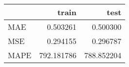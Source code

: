 \begin{tabular}{lrr}
\toprule
{} &       train &        test \\
\midrule
MAE  &    0.503261 &    0.500300 \\
MSE  &    0.294155 &    0.296787 \\
MAPE &  792.181786 &  788.852204 \\
\bottomrule
\end{tabular}
